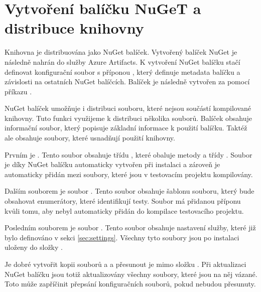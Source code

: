 \section{Vytvoření balíčku NuGeT a distribuce knihovny}\label{sec:distrbution}

Knihovna je distribuována jako NuGet balíček. Vytvořený balíček NuGet je následně nahrán do služby Azure Artifacts. K vytvoření NuGet balíčku stačí definovat konfigurační soubor s příponou , který definuje metadata balíčku a závislosti na ostatních NuGet balíčcích. Balíček je následně vytvořen za pomocí příkazu . 

NuGet balíček umožňuje i distribuci souboru, které nejsou součástí kompilované knihovny. Tuto funkci využijeme k distribuci několika souborů. Balíček obsahuje informační soubor, který popisuje základní informace k použití balíčku. Taktéž ale obsahuje soubory, které usnadňují použití knihovny. 

Prvním je . Tento soubor obsahuje třídu , které obaluje metody  a  třídy . Soubor je díky NuGet balíčku automaticky vytvořen při instalaci a zároveň je automaticky přidán mezi soubory, které jsou v testovacím projektu kompilovány. 

Dalším souborem je soubor . Tento soubor obsahuje šablonu souboru, který bude obsahovat enumerátory, které identifikují testy. Soubor má přidanou příponu  kvůli tomu, aby nebyl automaticky přidán do kompilace testovacího projektu.

Posledním souborem je soubor . Tento soubor obsahuje nastavení služby, které již bylo definováno v sekci \ref{sec:settings}. Všechny tyto soubory jsou po instalaci uloženy do složky .

Je dobré vytvořit kopii souborů  a  a přesunout je mimo složku . Při aktualizaci NuGet balíčku jsou totiž aktualizovány všechny soubory, které jsou na něj vázané. Toto může zapříčinit přepsání konfiguračních souborů, pokud nebudou přesunuty. 

